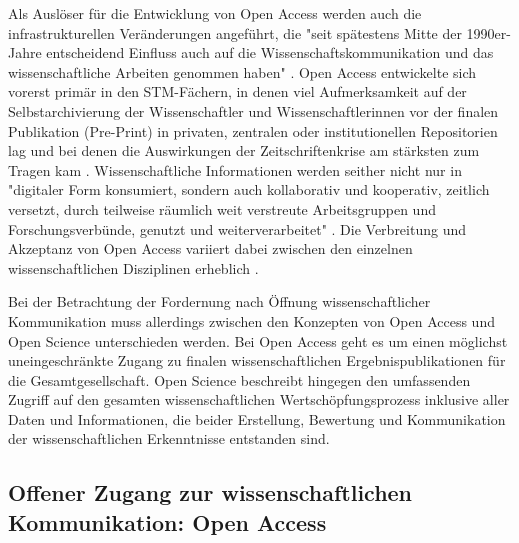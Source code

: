 Als Auslöser für die Entwicklung von Open Access werden auch die infrastrukturellen Veränderungen angeführt, die "seit spätestens Mitte der 1990er-Jahre entscheidend Einfluss auch auf die Wissenschaftskommunikation und das wissenschaftliche Arbeiten genommen haben" \cite{schulze_2013_open}. Open Access entwickelte sich vorerst primär in den STM-Fächern, in denen viel Aufmerksamkeit auf der Selbstarchivierung der Wissenschaftler und Wissenschaftlerinnen vor der finalen Publikation (Pre-Print) in privaten, zentralen oder institutionellen Repositorien lag \cite{adema_2013_political} und bei denen die Auswirkungen der Zeitschriftenkrise am stärksten zum Tragen kam \cite{naeder_2010_open}. Wissenschaftliche Informationen werden seither nicht nur in "digitaler Form konsumiert, sondern auch kollaborativ und kooperativ, zeitlich versetzt, durch teilweise räumlich weit verstreute Arbeitsgruppen und Forschungsverbünde, genutzt und weiterverarbeitet" \cite{schulze_2013_open}. Die Verbreitung und Akzeptanz von Open Access variiert dabei zwischen den einzelnen wissenschaftlichen Disziplinen erheblich \cite{cite:21a}.

Bei der Betrachtung der Fordernung nach Öffnung wissenschaftlicher Kommunikation muss allerdings zwischen den Konzepten von Open Access und Open Science unterschieden werden. Bei Open Access geht es um einen möglichst uneingeschränkte Zugang zu finalen wissenschaftlichen Ergebnispublikationen für die Gesamtgesellschaft. Open Science beschreibt hingegen den umfassenden Zugriff auf den gesamten wissenschaftlichen Wertschöpfungsprozess inklusive aller Daten und Informationen, die beider Erstellung, Bewertung und Kommunikation der wissenschaftlichen Erkenntnisse entstanden sind.

\subsection{Offener Zugang zur wissenschaftlichen Kommunikation: Open Access}

